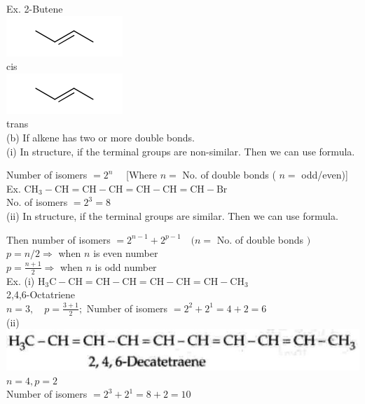 \documentclass[10pt]{article}
\begin{document}
Ex. 2-Butene\\
\includegraphics{smile-be8d1aca6b53cd9d419fde9c96c843f26da5bdc5}\\
cis\\
\includegraphics{smile-31adeffcfb34b6a8e33f7b13099c861f6cf00ba0}\\
trans\\
(b) If alkene has two or more double bonds.\\
(i) In structure, if the terminal groups are non-similar. Then we can use formula.

Number of isomers $=2^{n} \quad$ [Where $n=$ No. of double bonds ( $n=$ odd/even)]\\
Ex. $\mathrm{CH}_{3}-\mathrm{CH}=\mathrm{CH}-\mathrm{CH}=\mathrm{CH}-\mathrm{CH}=\mathrm{CH}-\mathrm{Br}$\\
No. of isomers $=2^{3}=8$\\
(ii) In structure, if the terminal groups are similar. Then we can use formula.

Then number of isomers $=2^{n-1}+2^{p-1} \quad(n=$ No. of double bonds $)$\\
$p=n / 2 \Rightarrow$ when $n$ is even number\\
$p=\frac{n+1}{2} \Rightarrow$ when $n$ is odd number\\
Ex. (i) $\mathrm{H}_{3} \mathrm{C}-\mathrm{CH}=\mathrm{CH}-\mathrm{CH}=\mathrm{CH}-\mathrm{CH}=\mathrm{CH}-\mathrm{CH}_{3}$\\
2,4,6-Octatriene\\
$n=3, \quad p=\frac{3+1}{2} ;$ Number of isomers $=2^{2}+2^{1}=4+2=6$\\
(ii)\\
\includegraphics[max width=\textwidth, center]{2025_01_28_8470952b98110cec3aabg-048}\\
$n=4, p=2$\\
Number of isomers $=2^{3}+2^{1}=8+2=10$
\end{document}
